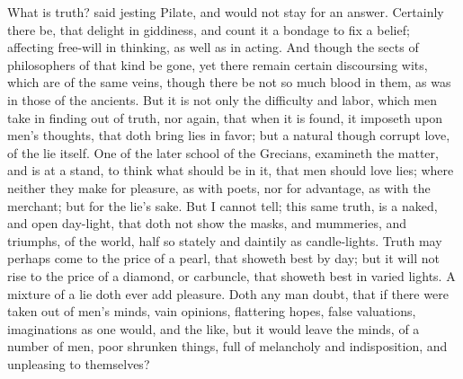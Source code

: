 \documentclass[12pt]{article}
\begin{document}
What is truth? said jesting Pilate, and would not stay for an
answer. Certainly there be, that delight in giddiness, and count it
a bondage to fix a belief; affecting free-will in thinking, as well as
in acting. And though the sects of philosophers of that kind be
gone, yet there remain certain discoursing wits, which are of the same
veins, though there be not so much blood in them, as was in those of
the ancients. But it is not only the difficulty and labor, which men
take in finding out of truth, nor again, that when it is found, it
imposeth upon men's thoughts, that doth bring lies in favor; but a
natural though corrupt love, of the lie itself. One of the later
school of the Grecians, examineth the matter, and is at a stand, to
think what should be in it, that men should love lies; where neither
they make for pleasure, as with poets, nor for advantage, as with
the merchant; but for the lie's sake. But I cannot tell; this same
truth, is a naked, and open day-light, that doth not show the masks,
and mummeries, and triumphs, of the world, half so stately and
daintily as candle-lights. Truth may perhaps come to the price of a
pearl, that showeth best by day; but it will not rise to the price
of a diamond, or carbuncle, that showeth best in varied lights. A
mixture of a lie doth ever add pleasure. Doth any man doubt, that if
there were taken out of men's minds, vain opinions, flattering
hopes, false valuations, imaginations as one would, and the like,
but it would leave the minds, of a number of men, poor shrunken
things, full of melancholy and indisposition, and unpleasing to
themselves?
\end{document}
